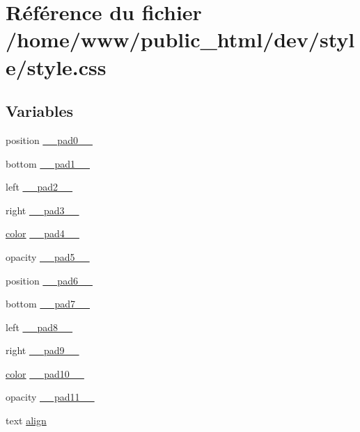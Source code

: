 \hypertarget{style_8css}{\section{Référence du fichier /home/www/public\-\_\-html/dev/style/style.css}
\label{style_8css}
}
\subsection*{Variables}
\begin{DoxyCompactItemize}
\item 
position \hyperlink{style_8css_ad9eedc94424c5d29cf38e583fb8bc973}{\-\_\-\-\_\-pad0\-\_\-\-\_\-}
\item 
bottom \hyperlink{style_8css_ac76c6cee6e81528325adb720ce36cd7c}{\-\_\-\-\_\-pad1\-\_\-\-\_\-}
\item 
left \hyperlink{style_8css_a7f14693d32b08d0a42e925c5768411bb}{\-\_\-\-\_\-pad2\-\_\-\-\_\-}
\item 
right \hyperlink{style_8css_a1261c7b57ba7e6c3bef7742b36005742}{\-\_\-\-\_\-pad3\-\_\-\-\_\-}
\item 
\hyperlink{style_8css_ac04e2a463631b69c8f70784275a056d6}{color} \hyperlink{style_8css_a4985cfa16ffaca78ca9505906cc67eb1}{\-\_\-\-\_\-pad4\-\_\-\-\_\-}
\item 
opacity \hyperlink{style_8css_aa6b385de9b816c43892787e4b74c6f46}{\-\_\-\-\_\-pad5\-\_\-\-\_\-}
\item 
position \hyperlink{style_8css_a3c4c7c770e23b2379cbe57ace60966f5}{\-\_\-\-\_\-pad6\-\_\-\-\_\-}
\item 
bottom \hyperlink{style_8css_ae2693e12324476fee0f84980d4080aeb}{\-\_\-\-\_\-pad7\-\_\-\-\_\-}
\item 
left \hyperlink{style_8css_aa14b5b3adba3170cb1a4e43b0dc28c34}{\-\_\-\-\_\-pad8\-\_\-\-\_\-}
\item 
right \hyperlink{style_8css_af880261c399ff2661813affb0b7258e4}{\-\_\-\-\_\-pad9\-\_\-\-\_\-}
\item 
\hyperlink{style_8css_ac04e2a463631b69c8f70784275a056d6}{color} \hyperlink{style_8css_a3874a778fe05ca36cd60ff2872850a7f}{\-\_\-\-\_\-pad10\-\_\-\-\_\-}
\item 
opacity \hyperlink{style_8css_a0a2c1506a2467b9384ff60f93957c78c}{\-\_\-\-\_\-pad11\-\_\-\-\_\-}
\item 
text \hyperlink{style_8css_a87061853e71984e1c11ad6f01f1035b2}{align}
\item 

\end{DoxyCompactItemize}
